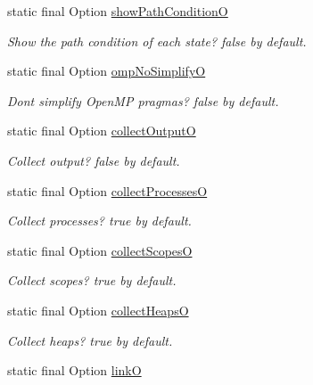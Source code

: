 \begin{DoxyCompactItemize}
static final Option \hyperlink{classedu_1_1udel_1_1cis_1_1vsl_1_1civl_1_1config_1_1IF_1_1CIVLConstants_a5a793aeb5f88161ab59225972f6727c7}{show\+Path\+Condition\+O}
\begin{DoxyCompactList}\small\item\em Show the path condition of each state? false by default. \end{DoxyCompactList}\item 
static final Option \hyperlink{classedu_1_1udel_1_1cis_1_1vsl_1_1civl_1_1config_1_1IF_1_1CIVLConstants_aa9db0fc1c94c2a4620214961cb741586}{omp\+No\+Simplify\+O}
\begin{DoxyCompactList}\small\item\em Don\textquotesingle{}t simplify Open\+M\+P pragmas? false by default. \end{DoxyCompactList}\item 
static final Option \hyperlink{classedu_1_1udel_1_1cis_1_1vsl_1_1civl_1_1config_1_1IF_1_1CIVLConstants_ac1153b953c2aa2a7eac2c655ac5b5161}{collect\+Output\+O}
\begin{DoxyCompactList}\small\item\em Collect output? false by default. \end{DoxyCompactList}\item 
static final Option \hyperlink{classedu_1_1udel_1_1cis_1_1vsl_1_1civl_1_1config_1_1IF_1_1CIVLConstants_a5cb8ebefe5ae7d1fabde032089d9df21}{collect\+Processes\+O}
\begin{DoxyCompactList}\small\item\em Collect processes? true by default. \end{DoxyCompactList}\item 
static final Option \hyperlink{classedu_1_1udel_1_1cis_1_1vsl_1_1civl_1_1config_1_1IF_1_1CIVLConstants_a45a3e47fe0b95159e3408389478f006a}{collect\+Scopes\+O}
\begin{DoxyCompactList}\small\item\em Collect scopes? true by default. \end{DoxyCompactList}\item 
static final Option \hyperlink{classedu_1_1udel_1_1cis_1_1vsl_1_1civl_1_1config_1_1IF_1_1CIVLConstants_a6fed1cf5d10a176d0f4e779addcea00b}{collect\+Heaps\+O}
\begin{DoxyCompactList}\small\item\em Collect heaps? true by default. \end{DoxyCompactList}\item 
static final Option \hyperlink{classedu_1_1udel_1_1cis_1_1vsl_1_1civl_1_1config_1_1IF_1_1CIVLConstants_a3bf647134f0f23bee0244adf7a30c78a}{link\+O}

\end{DoxyCompactItemize}
